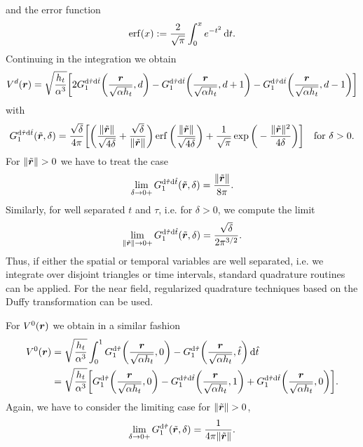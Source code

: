 \documentclass[a4paper,11pt]{article}
\begin{document}
and the error function
\begin{equation*}
  \operatorname{erf}(x) := \frac{2}{\sqrt{\pi}} \int_0^x e^{-t^2} \,{\mathrm{d}} t.
\end{equation*}
Continuing in the integration we obtain
\begin{equation*}
  V^d({{\bm{r}}}) = \sqrt{\frac{h_t}{\alpha^3}} \bigg[ 2G^{{\mathrm{d}}\hat\tau{\mathrm{d}}\hat t}_1\bigg(\frac{{{\bm{r}}}}{\sqrt{\alpha h_t}},d\bigg) - G^{{\mathrm{d}}\hat\tau{\mathrm{d}}\hat t}_1\bigg(\frac{{{\bm{r}}}}{\sqrt{\alpha h_t}},d+1\bigg) - G^{{\mathrm{d}}\hat\tau{\mathrm{d}}\hat t}_1\bigg(\frac{{{\bm{r}}}}{\sqrt{\alpha h_t}},d-1\bigg) \bigg]
\end{equation*}
with 
\begin{equation*}
  G^{{\mathrm{d}}\hat\tau{\mathrm{d}}\hat t}_1(\tilde{{{\bm{r}}}},\delta) = \frac{\sqrt{\delta}}{4\pi} \bigg[ \bigg( \frac{\|\tilde {{{\bm{r}}}}\|}{\sqrt{4\delta}} + \frac{\sqrt{\delta}}{\|\tilde {{{\bm{r}}}}\|} \bigg) \operatorname{erf}\bigg( \frac{\|\tilde {{{\bm{r}}}}\|}{\sqrt{4\delta}} \bigg) + \frac{1}{\sqrt{\pi}}\exp\bigg( -\frac{\|\tilde {{{\bm{r}}}}\|^2}{4\delta} \bigg) \bigg] \quad\text{for } \delta > 0.
\end{equation*}
For $\|\tilde {{{\bm{r}}}}\| > 0$ we have to treat the case
\begin{equation*}
  \lim_{\delta \to 0+} G^{{\mathrm{d}}\hat\tau{\mathrm{d}}\hat t}_1(\tilde{{{\bm{r}}}},\delta) = \frac{\|\tilde {{{\bm{r}}}}\|}{8\pi}.
\end{equation*} 
Similarly, for well separated $t$ and $\tau$, i.e. for $\delta > 0$, we compute the limit
\begin{equation*}
  \lim_{\|\tilde{{{\bm{r}}}}\|\to 0+} G^{{\mathrm{d}}\hat\tau{\mathrm{d}}\hat t}_1(\tilde{{{\bm{r}}}},\delta) = \frac{\sqrt{\delta}}{2\pi^{3/2}}.
\end{equation*}
Thus, if either the spatial or temporal variables are well separated, i.e. we integrate over disjoint triangles or time intervals, standard quadrature routines can be applied. For the near field, regularized quadrature techniques based on the Duffy transformation can be used. 

For $V^0({{\bm{r}}})$ we obtain in a similar fashion
\begin{align*}
  V^0({{\bm{r}}}) &= \sqrt{\frac{h_t}{\alpha^3}} \int_{0}^{1} G^{{\mathrm{d}}\hat \tau}_1\bigg(\frac{{{\bm{r}}}}{\sqrt{\alpha h_t}},0\bigg) - G^{{\mathrm{d}}\hat \tau}_1\bigg(\frac{{{\bm{r}}}}{\sqrt{\alpha h_t}},\hat t\bigg) \,{\mathrm{d}}\hat t \\
  &= \sqrt{\frac{h_t}{\alpha^3}} \bigg[ G^{{\mathrm{d}}\hat \tau}_1\bigg(\frac{{{\bm{r}}}}{\sqrt{\alpha h_t}},0\bigg) - G^{{\mathrm{d}}\hat\tau{\mathrm{d}}\hat t}_1\bigg(\frac{{{\bm{r}}}}{\sqrt{\alpha h_t}},1\bigg) + G^{{\mathrm{d}}\hat\tau{\mathrm{d}}\hat t}_1\bigg(\frac{{{\bm{r}}}}{\sqrt{\alpha h_t}},0\bigg) \bigg].
\end{align*}
Again, we have to consider the limiting case for $\|\tilde {{{\bm{r}}}}\| > 0$,
\begin{equation}
  \label{eq:G_dtau_lim_d}
  \lim_{\delta \to 0+} G^{{\mathrm{d}}\hat \tau}_1(\tilde {{{\bm{r}}}},\delta) = \frac{1}{4\pi\|\tilde {{{\bm{r}}}}\|}.
\end{equation}
\end{document}
